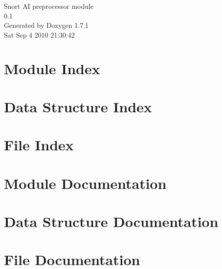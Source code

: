 \documentclass[a4paper]{book}
\begin{document}
\hypersetup{pageanchor=false}
\begin{titlepage}
\vspace*{7cm}
\begin{center}
{\Large Snort AI preprocessor module \\[1ex]\large 0.1 }\\
\vspace*{1cm}
{\large Generated by Doxygen 1.7.1}\\
\vspace*{0.5cm}
{\small Sat Sep 4 2010 21:30:42}\\
\end{center}
\end{titlepage}
\clearemptydoublepage
{}
\tableofcontents
\clearemptydoublepage
{}
\hypersetup{pageanchor=true}
\chapter{Module Index}

\chapter{Data Structure Index}

\chapter{File Index}

\chapter{Module Documentation}







\chapter{Data Structure Documentation}







\chapter{File Documentation}












\printindex
\end{document}
